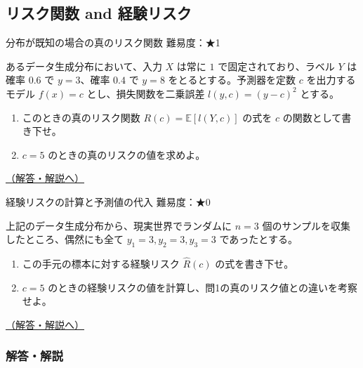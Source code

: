 \subsection{リスク関数 and
経験リスク}\label{ux30eaux30b9ux30afux95a2ux6570-and-ux7d4cux9a13ux30eaux30b9ux30af}

\begin{questionbox}[label=q:1-2-1]{分布が既知の場合の真のリスク関数 \hfill \normalfont \small 難易度：★1}

あるデータ生成分布において、入力 \(X\) は常に \(1\)
で固定されており、ラベル \(Y\) は確率 \(0.6\) で \(y=3\)、確率 \(0.4\)
で \(y=8\) をとるとする。予測器を定数 \(c\) を出力するモデル \(f(x)=c\)
とし、損失関数を二乗誤差 \(l(y, c) = (y-c)^2\) とする。

\begin{enumerate}
\def\labelenumi{\arabic{enumi}.}
\tightlist
\item
  このときの真のリスク関数 \(R(c) = \mathbb{E}[l(Y, c)]\) の式を \(c\)
  の関数として書き下せ。
\item
  \(c = 5\) のときの真のリスクの値を求めよ。
\end{enumerate}

\hfill 

\hyperref[a:1-2-1]{（解答・解説へ）}

\end{questionbox}

\begin{questionbox}[label=q:1-2-2]{経験リスクの計算と予測値の代入 \hfill \normalfont \small 難易度：★0}

上記のデータ生成分布から、現実世界でランダムに \(n=3\)
個のサンプルを収集したところ、偶然にも全て \(y_1=3, y_2=3, y_3=3\)
であったとする。

\begin{enumerate}
\def\labelenumi{\arabic{enumi}.}
\tightlist
\item
  この手元の標本に対する経験リスク \(\hat{R}(c)\) の式を書き下せ。
\item
  \(c=5\)
  のときの経験リスクの値を計算し、問1の真のリスク値との違いを考察せよ。
\end{enumerate}

\hfill 

\hyperref[a:1-2-2]{（解答・解説へ）}

\end{questionbox}

\subsubsection{解答・解説}\label{ux89e3ux7b54ux89e3ux8aac-1}

